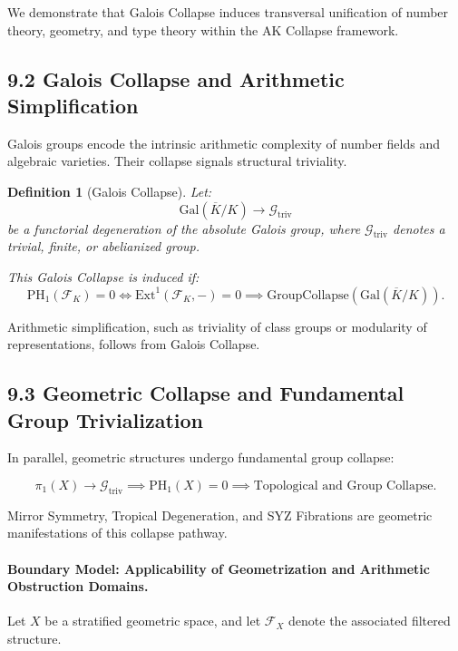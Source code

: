 \documentclass[11pt]{article}
\newtheorem{definition}[theorem]{Definition}
\begin{document}
We demonstrate that Galois Collapse induces transversal unification of number theory, geometry, and type theory within the AK Collapse framework.

\subsection*{9.2 Galois Collapse and Arithmetic Simplification}

Galois groups encode the intrinsic arithmetic complexity of number fields and algebraic varieties. Their collapse signals structural triviality.

\begin{definition}[Galois Collapse]
Let:
\[
\mathrm{Gal}(\overline{K}/K) \longrightarrow \mathcal{G}_{\mathrm{triv}}
\]
be a functorial degeneration of the absolute Galois group, where \( \mathcal{G}_{\mathrm{triv}} \) denotes a trivial, finite, or abelianized group.

This Galois Collapse is induced if:
\[
\mathrm{PH}_1(\mathcal{F}_K) = 0 \iff \mathrm{Ext}^1(\mathcal{F}_K, -) = 0 \implies \mathrm{GroupCollapse}(\mathrm{Gal}(\overline{K}/K)).
\]
\end{definition}

Arithmetic simplification, such as triviality of class groups or modularity of representations, follows from Galois Collapse.

\subsection*{9.3 Geometric Collapse and Fundamental Group Trivialization}

In parallel, geometric structures undergo fundamental group collapse:

\[
\pi_1(X) \longrightarrow \mathcal{G}_{\mathrm{triv}} \implies \mathrm{PH}_1(X) = 0 \implies \text{Topological and Group Collapse}.
\]

Mirror Symmetry, Tropical Degeneration, and SYZ Fibrations are geometric manifestations of this collapse pathway.

\paragraph{Boundary Model: Applicability of Geometrization and Arithmetic Obstruction Domains.}

Let \( X \) be a stratified geometric space, and let \( \mathcal{F}_X \) denote the associated filtered structure.
\end{document}
